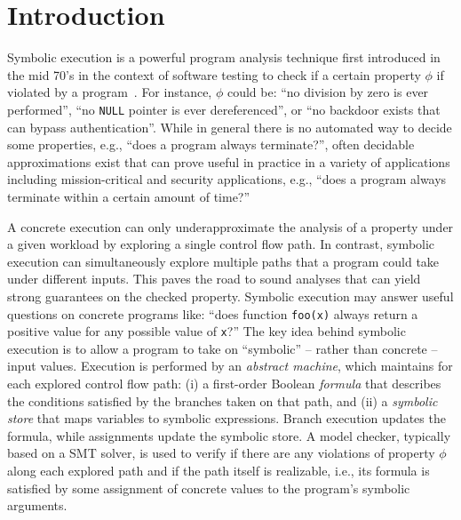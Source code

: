 
\section{Introduction}

Symbolic execution is a powerful program analysis technique first introduced in the mid 70's in the context of software testing to check if a certain property $\phi$ if violated by a program~\cite{K-CACM76,H-TSE77}. For instance, $\phi$ could be: ``no division by zero is ever performed'', ``no {\tt NULL} pointer is ever dereferenced'', or ``no backdoor exists that can bypass authentication''. While in general there is no automated way to decide some properties, e.g., ``does a program always terminate?'', often decidable approximations exist that can prove useful in practice in a variety of applications including mission-critical and security applications, e.g., ``does a program always terminate within a certain amount of time?''

A concrete execution can only underapproximate the analysis of a property under a given workload by exploring a single control flow path. In contrast, symbolic execution can simultaneously explore multiple paths that a program could take under different inputs. This paves the road to sound analyses that can yield strong guarantees on the checked property. Symbolic execution may answer useful questions on concrete programs like: ``does function {\tt foo(x)} always return a positive value for any possible value of {\tt x}?'' The key idea behind symbolic execution is to allow a program to take on ``symbolic'' -- rather than concrete -- input values. Execution is performed by an {\em abstract machine}, which maintains for each explored control flow path: (i) a first-order Boolean {\em formula} that describes the conditions satisfied by the branches taken on that path, and (ii) a {\em symbolic store} that maps variables to symbolic expressions. Branch execution updates the formula, while assignments update the symbolic store. A model checker, typically based on a SMT solver, is used to verify if there are any violations of property $\phi$ along each explored path and if the path itself is realizable, i.e., its formula is satisfied by some assignment of concrete values to the program's symbolic arguments.


